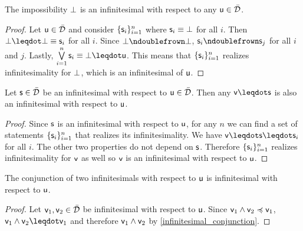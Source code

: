 \documentclass[10pt, onecolumn, longbibliography, nofootinbib]{revtex4-2}
\begin{document}
\begin{coro}
	The impossibility $\impossibility$ is an infinitesimal with respect to any $\stmt[u] \in \tdomain$.
\end{coro}

\begin{proof}
	Let $\stmt[u] \in \tdomain$ and consider $\{ \stmt_i \}_{i=1}^n$ where $\stmt_i \equiv \impossibility$ for all $i$. Then $\impossibility \finer \impossibility \equiv \stmt_i$ for all $i$. Since $\impossibility \ncomp \impossibility$, $\stmt_i \ncomp \stmt_j$ for all $i$ and $j$. Lastly, $\bigOR\limits_{i=1}^n \stmt_i \equiv \impossibility \finer \stmt[u]$. This means that $\{ \stmt_i \}_{i=1}^n$ realizes infinitesimality for $\impossibility$, which is an infinitesimal of $\stmt[u]$.
\end{proof}

\begin{prop}\label{infinitesimal_conjunction}
	Let $\stmt \in \tdomain$ be an infinitesimal with respect to $\stmt[u] \in \tdomain$. Then any $\stmt[v] \finer \stmt$ is also an infinitesimal with respect to $\stmt[u]$.
\end{prop}
\begin{proof}
	Since $\stmt$ is an infinitesimal with respect to $\stmt[u]$, for any $n$ we can find a set of statements $\{ \stmt_i \}_{i=1}^n$ that realizes its infinitesimality. We have $\stmt[v] \finer \stmt \finer \stmt_i$ for all $i$. The other two properties do not depend on $\stmt$. Therefore $\{ \stmt_i \}_{i=1}^n$ realizes infinitesimality for $\stmt[v]$ as well so $\stmt[v]$ is an infinitesimal with respect to $\stmt[u]$.
\end{proof}

\begin{coro}
	The conjunction of two infinitesimals with respect to $\stmt[u]$ is infinitesimal with respect to $\stmt[u]$.
\end{coro}
\begin{proof}
	Let $\stmt[v]_1, \stmt[v]_2 \in \tdomain$ be infinitesimal with respect to $\stmt[u]$. Since $\stmt[v]_1 \AND \stmt[v]_2 \narrower \stmt[v]_1$, $\stmt[v]_1 \AND \stmt[v]_2 \finer \stmt[v]_1$ and therefore $\stmt[v]_1 \AND \stmt[v]_2$ by \ref{infinitesimal_conjunction}.
\end{proof}
\end{document}
